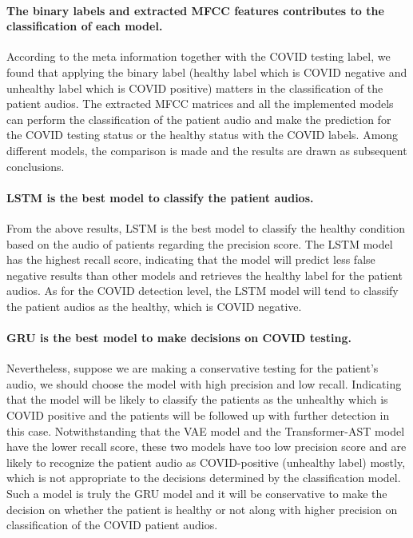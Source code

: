 \documentclass[11pt]{article}
\begin{document}
\paragraph{The binary labels and extracted MFCC features contributes to the classification of each model.} According to the meta information together with the COVID testing label, we found that applying the binary label (healthy label which is COVID negative and unhealthy label which is COVID positive) matters in the classification of the patient audios. The extracted MFCC matrices and all the implemented models can perform the classification of the patient audio and make the prediction for the COVID testing status or the healthy status with the COVID labels. Among different models, the comparison is made and the results are drawn as subsequent conclusions.

\paragraph{LSTM is the best model to classify the patient audios.} From the above results, LSTM is the best model to classify the healthy condition based on the audio of patients regarding the precision score. The LSTM model has the highest recall score, indicating that the model will predict less false negative results than other models and retrieves the healthy label for the patient audios. As for the COVID detection level, the LSTM model will tend to classify the patient audios as the healthy, which is COVID negative.

\paragraph{GRU is the best model to make decisions on COVID testing.} Nevertheless, suppose we are making a conservative testing for the patient's audio, we should choose the model with high precision and low recall. Indicating that the model will be likely to classify the patients as the unhealthy which is COVID positive and the patients will be followed up with further detection in this case. Notwithstanding that the VAE model and the Transformer-AST model have the lower recall score, these two models have too low precision score and are likely to recognize the patient audio as COVID-positive (unhealthy label) mostly, which is not appropriate to the decisions determined by the classification model. Such a model is truly the GRU model and it will be conservative to make the decision on whether the patient is healthy or not along with higher precision on classification of the COVID patient audios. 
\end{document}
